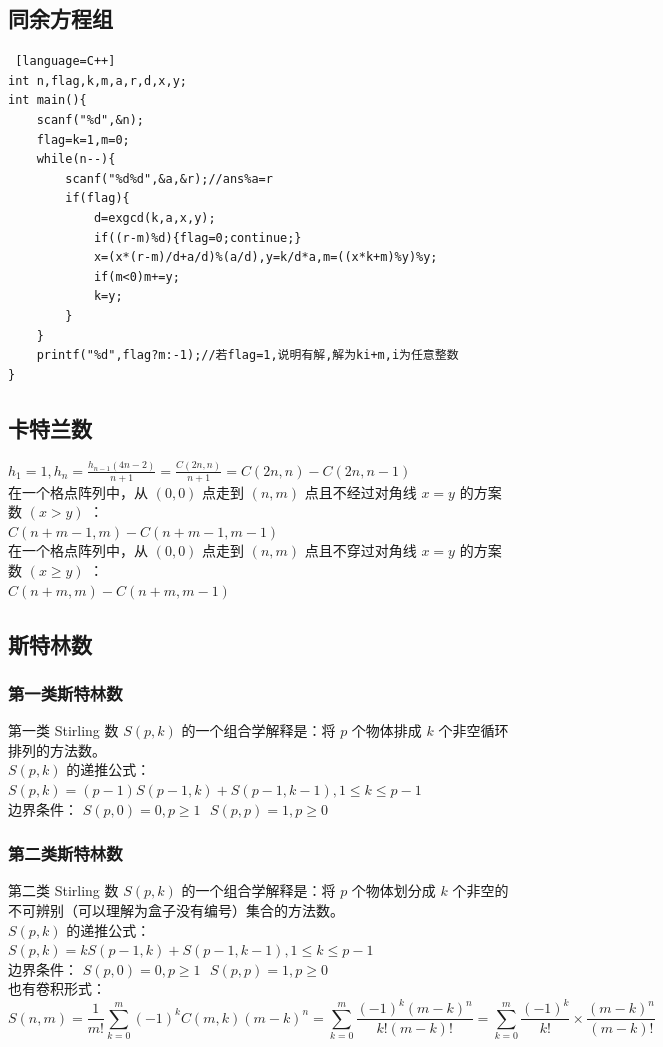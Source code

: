 \documentclass{article}
\begin{document}
\subsection{同余方程组}
\begin{lstlisting} [language=C++]
int n,flag,k,m,a,r,d,x,y;
int main(){
	scanf("%d",&n);
	flag=k=1,m=0;
	while(n--){
		scanf("%d%d",&a,&r);//ans%a=r
		if(flag){
			d=exgcd(k,a,x,y);
			if((r-m)%d){flag=0;continue;}
			x=(x*(r-m)/d+a/d)%(a/d),y=k/d*a,m=((x*k+m)%y)%y;
			if(m<0)m+=y;
			k=y;
		}
	}
	printf("%d",flag?m:-1);//若flag=1,说明有解,解为ki+m,i为任意整数
}
\end{lstlisting}
\subsection{卡特兰数}
$h_1 = 1, h_n = \frac{h_{n-1}(4n-2)}{n+1} = \frac{C(2n, n)}{n+1} = C(2n, n) - C(2n, n-1)$ \\
在一个格点阵列中，从 $(0, 0)$ 点走到 $(n, m)$ 点且不经过对角线 $x = y$ 的方案数 $(x > y)$ ： \\  $C(n+m-1, m) - C(n+m-1, m-1)$ \\
在一个格点阵列中，从 $(0, 0)$ 点走到 $(n, m)$ 点且不穿过对角线 $x = y$ 的方案数 $(x \geq y)$ ： \\ $C(n+m, m) - C(n+m, m-1)$ 
\subsection{斯特林数}
\subsubsection{第一类斯特林数}
第一类 Stirling 数 $S(p, k)$ 的一个组合学解释是：将 $p$ 个物体排成 $k$ 个非空循环排列的方法数。 \\
$S(p, k)$ 的递推公式： $S(p, k) = (p-1) S(p-1, k) + S(p-1, k-1), 1 \leq k \leq p-1$ \\
边界条件： $S(p, 0) = 0, p \geq 1 \text{    } S(p, p) = 1, p \geq 0$
\subsubsection{第二类斯特林数}
第二类 Stirling 数 $S(p, k)$ 的一个组合学解释是：将 $p$ 个物体划分成 $k$ 个非空的不可辨别（可以理解为盒子没有编号）集合的方法数。\\
$S(p, k)$ 的递推公式： $S(p, k) = k S(p-1, k) + S(p-1, k-1), 1 \leq k \leq p-1$ \\
边界条件： $S(p, 0) = 0, p \geq 1 \text{    } S(p, p) = 1, p \geq 0$\\
也有卷积形式： \\
$$S(n, m) = \frac{1}{m!} \sum\limits_{k=0}^{m}(-1)^kC(m,k)(m-k)^n = \sum\limits_{k=0}^{m} \frac{(-1)^k(m-k)^n}{k!(m-k)!} = \sum\limits_{k=0}^{m}\frac{(-1)^k}{k!} \times \frac{(m-k)^n}{(m-k)!}$$
\end{document}
